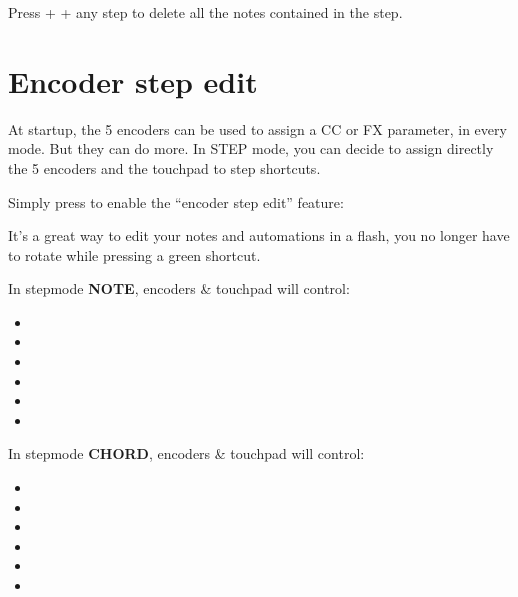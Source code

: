 Press  +  + any step \stepbystepicon{} to delete all the notes contained in the step.



\section{Encoder step edit}

At startup, the 5 encoders \encodersicon{} can be used to assign a CC or FX parameter, in every mode. But they can do more. In STEP mode, you can decide to assign directly the 5 encoders and the touchpad to step shortcuts.

Simply press  to enable the ``encoder step edit'' feature:


It's a great way to edit your notes and automations in a flash, you no longer have to rotate \encodericon{} while pressing a green shortcut.

In stepmode \textbf{NOTE}, encoders \& touchpad will control:

\begin{itemize}
\item {}
\item {}
\item {}
\item {}
\item {}
\item {}
\end{itemize}

In stepmode \textbf{CHORD}, encoders \& touchpad will control:

\begin{itemize}
\item {}
\item {}
\item {}
\item {}
\item {}
\item {}
\end{itemize}


